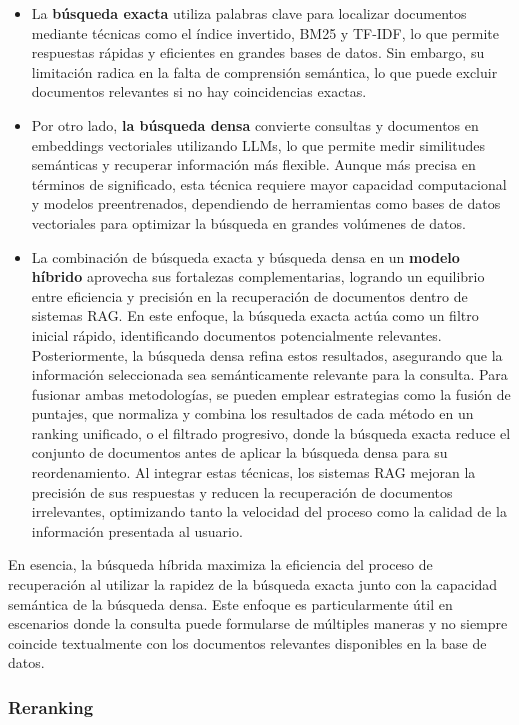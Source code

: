 \begin{itemize}
    \item La \textbf{búsqueda exacta} utiliza palabras clave para localizar documentos mediante técnicas como el índice invertido, BM25 y TF-IDF, lo que permite respuestas rápidas y eficientes en grandes bases de datos. 
    Sin embargo, su limitación radica en la falta de comprensión semántica, lo que puede excluir documentos relevantes si no hay coincidencias exactas. 
    \item Por otro lado, \textbf{la búsqueda densa} convierte consultas y documentos en embeddings vectoriales utilizando LLMs, lo que permite medir similitudes semánticas y recuperar información más flexible. 
    Aunque más precisa en términos de significado, esta técnica requiere mayor capacidad computacional y modelos preentrenados, dependiendo de herramientas como bases de datos vectoriales para optimizar la búsqueda en grandes volúmenes de datos.
    \item La combinación de búsqueda exacta y búsqueda densa en un \textbf{modelo híbrido} aprovecha sus fortalezas complementarias, logrando un equilibrio entre eficiencia y precisión en la recuperación de documentos dentro de sistemas RAG.
    En este enfoque, la búsqueda exacta actúa como un filtro inicial rápido, identificando documentos potencialmente relevantes. Posteriormente, la búsqueda densa refina estos resultados, asegurando que la información seleccionada sea semánticamente relevante para la consulta.
    Para fusionar ambas metodologías, se pueden emplear estrategias como la fusión de puntajes, que normaliza y combina los resultados de cada método en un ranking unificado, o el filtrado progresivo, donde la búsqueda exacta reduce el conjunto de documentos antes de aplicar la búsqueda densa para su reordenamiento.
    Al integrar estas técnicas, los sistemas RAG mejoran la precisión de sus respuestas y reducen la recuperación de documentos irrelevantes, optimizando tanto la velocidad del proceso como la calidad de la información presentada al usuario.
\end{itemize}
En esencia, la búsqueda híbrida maximiza la eficiencia del proceso de recuperación al utilizar la rapidez de la búsqueda exacta junto con la capacidad semántica de la búsqueda densa. Este enfoque es particularmente útil en escenarios donde la consulta puede formularse de múltiples maneras y no siempre coincide textualmente con los documentos relevantes disponibles en la base de datos.

\subsubsection{Reranking}

